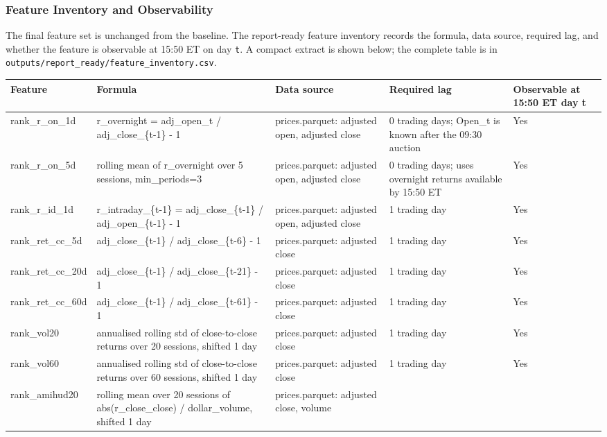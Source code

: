 \documentclass[
]{article}
\begin{document}
\hypertarget{feature-inventory-and-observability}{%
\subsubsection{Feature Inventory and
Observability}\label{feature-inventory-and-observability}}

The final feature set is unchanged from the baseline. The report-ready
feature inventory records the formula, data source, required lag, and
whether the feature is observable at 15:50 ET on day \texttt{t}. A
compact extract is shown below; the complete table is in
\texttt{outputs/report\_ready/feature\_inventory.csv}.

\begin{longtable}[]{@{}lllll@{}}
\toprule
Feature & Formula & Data source & Required lag & Observable at 15:50 ET
day t \\
\midrule
\endhead
rank\_r\_on\_1d & r\_overnight = adj\_open\_t / adj\_close\_\{t-1\} - 1
& prices.parquet: adjusted open, adjusted close & 0 trading days;
Open\_t is known after the 09:30 auction & Yes \\
rank\_r\_on\_5d & rolling mean of r\_overnight over 5 sessions,
min\_periods=3 & prices.parquet: adjusted open, adjusted close & 0
trading days; uses overnight returns available by 15:50 ET & Yes \\
rank\_r\_id\_1d & r\_intraday\_\{t-1\} = adj\_close\_\{t-1\} /
adj\_open\_\{t-1\} - 1 & prices.parquet: adjusted open, adjusted close &
1 trading day & Yes \\
rank\_ret\_cc\_5d & adj\_close\_\{t-1\} / adj\_close\_\{t-6\} - 1 &
prices.parquet: adjusted close & 1 trading day & Yes \\
rank\_ret\_cc\_20d & adj\_close\_\{t-1\} / adj\_close\_\{t-21\} - 1 &
prices.parquet: adjusted close & 1 trading day & Yes \\
rank\_ret\_cc\_60d & adj\_close\_\{t-1\} / adj\_close\_\{t-61\} - 1 &
prices.parquet: adjusted close & 1 trading day & Yes \\
rank\_vol20 & annualised rolling std of close-to-close returns over 20
sessions, shifted 1 day & prices.parquet: adjusted close & 1 trading day
& Yes \\
rank\_vol60 & annualised rolling std of close-to-close returns over 60
sessions, shifted 1 day & prices.parquet: adjusted close & 1 trading day
& Yes \\
rank\_amihud20 & rolling mean over 20 sessions of abs(r\_close\_close) /
dollar\_volume, shifted 1 day & prices.parquet: adjusted close, volume &

\end{longtable}
\end{document}
